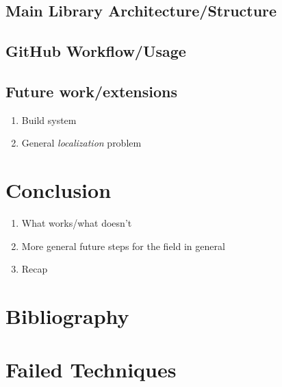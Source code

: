 \documentclass[
  a4paper,
  DIV=11,
  numbers=noendperiod]{scrreprt}
\providecommand{\tightlist}{%
  \setlength{\itemsep}{0pt}\setlength{\parskip}{0pt}}
\begin{document}
\section{Main Library
Architecture/Structure}\label{main-library-architecturestructure}

\section{GitHub Workflow/Usage}\label{github-workflowusage}

\section{Future work/extensions}\label{future-workextensions}

\begin{enumerate}
\def\labelenumi{\arabic{enumi}.}
\tightlist
\item
  Build system
\item
  General \emph{localization} problem
\end{enumerate}


\chapter{Conclusion}\label{conclusion}

\begin{enumerate}
\def\labelenumi{\arabic{enumi}.}
\tightlist
\item
  What works/what doesn't
\item
  More general future steps for the field in general
\item
  Recap
\end{enumerate}


\chapter*{Bibliography}\label{bibliography}


\printbibliography[heading=none]

\cleardoublepage
{}
{}
\appendix

\chapter{Failed Techniques}\label{failed-techniques}
\end{document}
